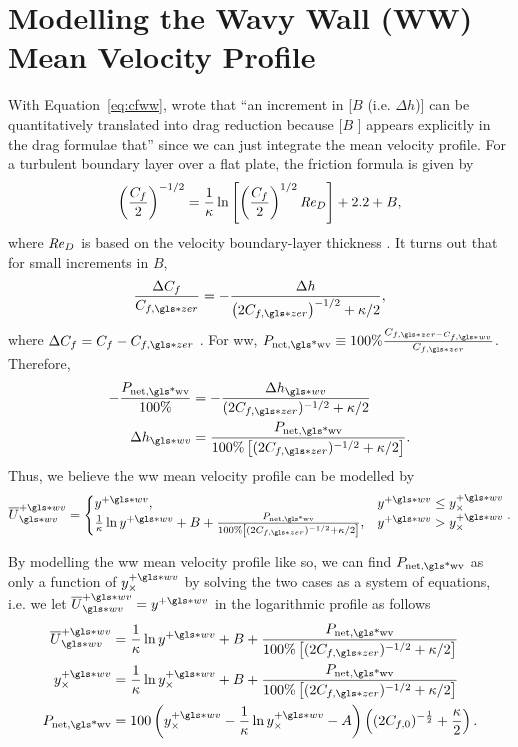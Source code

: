 \section{Modelling the Wavy Wall (WW) Mean Velocity Profile}
With Equation~\eqref{eq:cfww}, \textcite{luchini1996} wrote that ``an increment in [$B$ (i.e.  $\Delta h$)] can be quantitatively translated into drag reduction because [$B$ ] appears explicitly in the drag formulae that'' since we can just integrate the mean velocity profile. For a turbulent boundary layer over a flat plate, the friction formula is given by
\begin{equation}
	\left( \frac{C_f}{2} \right) ^{-1 /2} = \frac{1}{\kappa}\ln \left[ \left( \frac{C_f}{2} \right) ^{1 /2 } \mbox{\textit{Re}}_D \right] + 2.2 + B
,\end{equation}
where $\mbox{\textit{Re}}_D $ is based on the velocity boundary-layer thickness \cite{white1991}. It turns out that for small increments in $B$,
 \begin{equation}
	 \frac{\Delta C_f}{C_{f,\gls*{zer}}}=-\frac{\Delta h}{\left(2C_{f,\gls*{zer}}\right)^{-1 /2} +\kappa /2}\label{eq:luchini}
,\end{equation}
where $\Delta C_f=C_f-C_{f,\gls*{zer}}$ \cite{luchini1996}. For \gls*{ww}, $P_\text{net,\gls*{wv}} \equiv100\% \frac{C_{f,\gls*{zer}-C_{f,\gls*{wv}}}}{C_{f,\gls*{zer}}}$. Therefore,
\begin{align}
	-\frac{P_\text{net,\gls*{wv}}}{100\%} &=-\frac{\Delta h\ww}{(2C_{f,\gls*{zer}})^{-1 / 2}+\kappa / 2}\\
	\Delta h\ww &= \frac{P_\text{net,\gls*{wv}}}{100\%\left[(2C_{f,\gls*{zer}})^{-1 / 2}+\kappa / 2\right]}
.\end{align}
Thus, we believe the \gls*{ww} mean velocity profile can be modelled by
\begin{equation}
	\overline{U}\ww\pw =
	\begin{cases}
		y\pw, & y\pw\leq y_{\times}\pw\\
		\frac{1}{\kappa}\ln y\pw +B +\frac{P_\text{net,\gls*{wv}}}{100\%\left[(2C_{f,\gls*{zer}})^{-1 / 2}+\kappa / 2\right]}, & y\pw>y_{\times}\pw
	\end{cases}
.\end{equation}

By modelling the \gls*{ww} mean velocity profile like so, we can find $P_\text{net,\gls*{wv}} $ as only a function of $y_{\times}\pw$ by solving the two cases as a system of equations, i.e. we let $\overline{U}\ww\pw=y\pw$ in the logarithmic profile as follows
\begin{align}
	\overline{U}\pw\ww &=\frac{1}{\kappa}\ln y\pw +B +\frac{P_\text{net,\gls*{wv}}}{100\%\left[(2C_{f,\gls*{zer}})^{-1 / 2}+\kappa / 2\right]} \\
	y_\times\pw &=\frac{1}{\kappa}\ln y_\times\pw +B +\frac{P_\text{net,\gls*{wv}}}{100\%\left[(2C_{f,\gls*{zer}})^{-1 / 2}+\kappa / 2\right]} \\
	P_\text{net,\gls*{wv}} &=100\left(  y_{\times}\pw - \frac{1}{\kappa}\ln y_{\times}\pw - A \right) \left( (2C_{f,0})^{-\frac{1}{2}} +\frac{\kappa}{2} \right) 
.\end{align}

